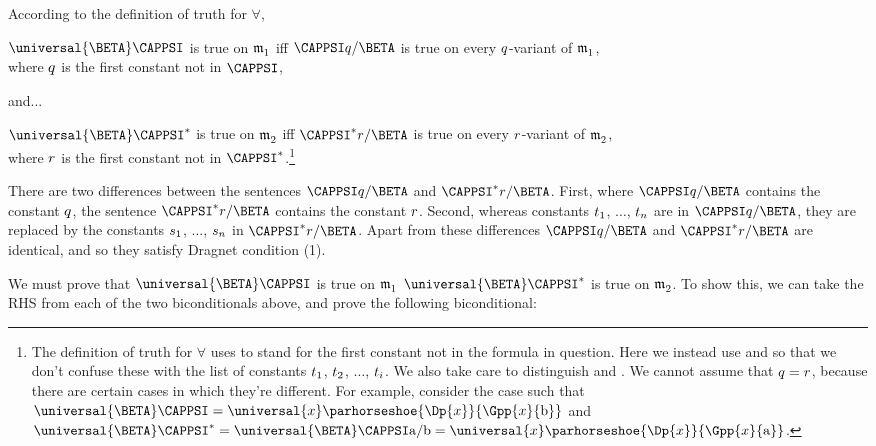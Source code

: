\begin{PROOF}
\begin{description}
\begin{description}
According to the definition of truth for $\forall$,
\begin{center}
$\universal{\BETA}\CAPPSI$ is true on $\mathfrak{m^{\mathrm{}}_{\mathrm{1}}}$
  iff $\CAPPSI\variable{q}/\BETA$ is true on every $q$-variant of $\mathfrak{m^{\mathrm{}}_{\mathrm{1}}}$, \\where $q$ is the first constant not in $\CAPPSI$,
\end{center}
 and...
\begin{center}
	$\universal{\BETA}\CAPPSI^*$ is true on $\mathfrak{m^{\mathrm{}}_{\mathrm{2}}}$
	iff $\CAPPSI^*\variable{r}/\BETA$ is true on every $r$-variant of $\mathfrak{m^{\mathrm{}}_{\mathrm{2}}}$, \\where $r$ is the first constant not in $\CAPPSI^*$.\footnote{The definition of truth for $\forall$ uses  to stand for the first constant not in the formula in question.  Here we instead use  and  so that we don't confuse these with the list of constants $t_1$, $t_2$, $\ldots$, $t_{i}$. We also take care to distinguish  and .  We cannot assume that $q=r$, because there are certain cases in which they're different. For example, consider the case such that $\universal{\BETA}\CAPPSI=\universal{\variable{x}}\parhorseshoe{\Dp{\variable{x}}}{\Gpp{\variable{x}}{\constant{b}}}$ and $\universal{\BETA}\CAPPSI^*=\universal{\BETA}\CAPPSI\constant{a}/\constant{b}=\universal{\variable{x}}\parhorseshoe{\Dp{\variable{x}}}{\Gpp{\variable{x}}{\constant{a}}}$.}
\end{center}

There are two differences between the sentences $\CAPPSI\variable{q}/\BETA$ and $\CAPPSI^*\variable{r}/\BETA$.  First, where $\CAPPSI\variable{q}/\BETA$ contains the constant $q$, the sentence $\CAPPSI^*\variable{r}/\BETA$ contains the constant $r$.  Second, whereas constants $t_1$, $\ldots$, $t_n$ are in $\CAPPSI\variable{q}/\BETA$, they are replaced by the constants $s_1$, $\ldots$, $s_n$ in $\CAPPSI^*\variable{r}/\BETA$.  Apart from these differences $\CAPPSI\variable{q}/\BETA$ and $\CAPPSI^*\variable{r}/\BETA$ are identical, and so they satisfy Dragnet condition (1).

We must prove that $\universal{\BETA}\CAPPSI$ is true on $\mathfrak{m^{\mathrm{}}_{\mathrm{1}}}$ \Iff $\universal{\BETA}\CAPPSI^*$ is true on $\mathfrak{m^{\mathrm{}}_{\mathrm{2}}}$.  To show this, we can take the RHS from each of the two biconditionals above, and prove the following biconditional:


\end{description}
\end{description}
\end{PROOF}
